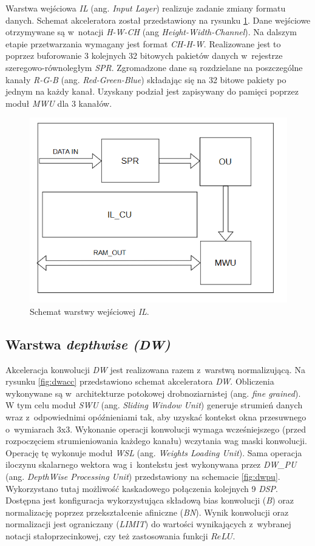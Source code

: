 Warstwa wejściowa \emph{IL} (ang. \emph{Input Layer}) realizuje zadanie zmiany formatu danych.
Schemat akceleratora został przedstawiony na rysunku \ref{fig:il}.
Dane wejściowe otrzymywane są w~notacji \emph{H-W-CH} (ang \emph{Height-Width-Channel}).
Na dalszym etapie przetwarzania wymagany jest format \emph{CH-H-W}.
Realizowane jest to poprzez buforowanie 3 kolejnych 32 bitowych pakietów danych w~rejestrze szeregowo-równoległym \emph{SPR}.
Zgromadzone dane są rozdzielane na poszczególne kanały \emph{R-G-B} (ang. \emph{Red-Green-Blue}) składając się na 32 bitowe pakiety po jednym na każdy kanał.
Uzyskany podział jest zapisywany do pamięci poprzez moduł \emph{MWU} dla 3 kanałów.
\begin{figure}
    \centering
    \includegraphics[width=0.8\linewidth]{images/ILACC.png}
    \caption{Schemat warstwy wejściowej \emph{IL}.}
    \label{fig:il}
\end{figure}

\subsection{Warstwa \emph{depthwise (DW)}}

Akceleracja konwolucji \emph{DW} jest realizowana razem z~warstwą normalizującą.
Na rysunku \ref{fig:dwacc} przedstawiono schemat akceleratora \emph{DW}.
Obliczenia wykonywane są w~architekturze potokowej drobnoziarnistej (ang. \emph{fine grained}). 
W tym celu moduł \emph{SWU} (ang. \emph{Sliding Window Unit}) generuje strumień danych wraz z~odpowiednimi opóźnieniami tak, aby uzyskać kontekst okna przesuwnego o~wymiarach 3x3.
Wykonanie operacji konwolucji wymaga wcześniejszego (przed rozpoczęciem strumieniowania każdego kanału) wczytania wag maski konwolucji.
Operację tę wykonuje moduł \emph{WSL} (ang. \textit{Weights Loading Unit}).
Sama operacja iloczynu skalarnego wektora wag i~kontekstu jest wykonywana przez \emph{DW\_PU} (ang. \emph{DepthWise Processing Unit}) przedstawiony na schemacie \ref{fig:dwpu}.
Wykorzystano tutaj możliwość kaskadowego połączenia kolejnych 9 \emph{DSP}. 
Dostępna jest konfiguracja wykorzystująca składową bias konwolucji (\emph{B}) oraz normalizację poprzez przekształcenie afiniczne (\emph{BN}).
Wynik konwolucji oraz normalizacji jest ograniczany (\emph{LIMIT}) do wartości wynikających z~wybranej notacji stałoprzecinkowej, czy też zastosowania funkcji $ReLU$.

